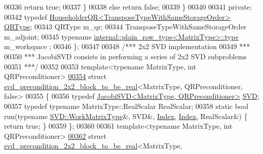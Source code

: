 \begin{DoxyCode}
00336       \textcolor{keywordflow}{return} \textcolor{keyword}{true};
00337     \}
00338     \textcolor{keywordflow}{else} \textcolor{keywordflow}{return} \textcolor{keyword}{false};
00339   \}
00340 
00341 \textcolor{keyword}{private}:
00342   \textcolor{keyword}{typedef} \hyperlink{group___q_r___module}{HouseholderQR<TransposeTypeWithSameStorageOrder>} 
      \hyperlink{group___q_r___module}{QRType};
00343   QRType m\_qr;
00344   TransposeTypeWithSameStorageOrder m\_adjoint;
00345   \textcolor{keyword}{typename} \hyperlink{class_eigen_1_1internal_1_1_tensor_lazy_evaluator_writable}{internal::plain\_row\_type<MatrixType>::type} m\_workspace
      ;
00346 \};
00347 
00348 \textcolor{comment}{/*** 2x2 SVD implementation}
00349 \textcolor{comment}{ ***}
00350 \textcolor{comment}{ *** JacobiSVD consists in performing a series of 2x2 SVD subproblems}
00351 \textcolor{comment}{ ***/}
00352 
00353 \textcolor{keyword}{template}<\textcolor{keyword}{typename} MatrixType, \textcolor{keywordtype}{int} QRPreconditioner>
\hyperlink{struct_eigen_1_1internal_1_1svd__precondition__2x2__block__to__be__real_3_01_matrix_type_00_01_q076cf26720930d18ea7d222bbee662fd}{00354} \textcolor{keyword}{struct }\hyperlink{struct_eigen_1_1internal_1_1svd__precondition__2x2__block__to__be__real}{svd\_precondition\_2x2\_block\_to\_be\_real}<MatrixType, 
      QRPreconditioner, false>
00355 \{
00356   \textcolor{keyword}{typedef} \hyperlink{group___s_v_d___module_class_eigen_1_1_jacobi_s_v_d}{JacobiSVD<MatrixType, QRPreconditioner>} 
      \hyperlink{group___s_v_d___module_class_eigen_1_1_jacobi_s_v_d}{SVD};
00357   \textcolor{keyword}{typedef} \textcolor{keyword}{typename} MatrixType::RealScalar RealScalar;
00358   \textcolor{keyword}{static} \textcolor{keywordtype}{bool} run(\textcolor{keyword}{typename} \hyperlink{group___core___module}{SVD::WorkMatrixType}&, SVD&, \hyperlink{namespace_eigen_a62e77e0933482dafde8fe197d9a2cfde}{Index}, 
      \hyperlink{namespace_eigen_a62e77e0933482dafde8fe197d9a2cfde}{Index}, RealScalar&) \{ \textcolor{keywordflow}{return} \textcolor{keyword}{true}; \}
00359 \};
00360 
00361 \textcolor{keyword}{template}<\textcolor{keyword}{typename} MatrixType, \textcolor{keywordtype}{int} QRPreconditioner>
\hyperlink{struct_eigen_1_1internal_1_1svd__precondition__2x2__block__to__be__real_3_01_matrix_type_00_01_qb58fa819a3391e7d55d98ccdc14db9e4}{00362} \textcolor{keyword}{struct }\hyperlink{struct_eigen_1_1internal_1_1svd__precondition__2x2__block__to__be__real}{svd\_precondition\_2x2\_block\_to\_be\_real}<MatrixType, 

\end{DoxyCode}
